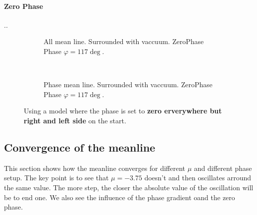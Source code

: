 \documentclass[../main.tex]{subfiles}
\begin{document}
\paragraph{Zero Phase}..
\begin{figure}[H]
    \begin{subfigure}{0.4\textwidth}
        \centering
        \hspace{-4cm} %
        
        \caption{All mean line. Surrounded with vaccuum. ZeroPhase Phase $\varphi = 117\deg$.}
        \label{fig:first}
    \end{subfigure}    \\
    \begin{subfigure}{0.4\textwidth}
        \centering
        \hspace{-4cm} %
        
        \caption{Phase mean line. Surrounded with vaccuum. ZeroPhase Phase $\varphi = 117\deg$.}
        \label{fig:first}
    \end{subfigure}   
    \caption{Using a model where the phase is set to \textbf{zero erverywhere but right and left side} on the start.}
\end{figure}

\subsection{Convergence of the meanline} 

This section shows how the meanline converges for different $\mu$ and different phase setup. 
The key point is to see that $\mu = -3.75$ doesn't and then oscillates arround the same value. 
The more step, the closer the absolute value of the 
oscillation will be to end one. We also see the influence of the phase gradient oand the zero phase.\\
\end{document}
